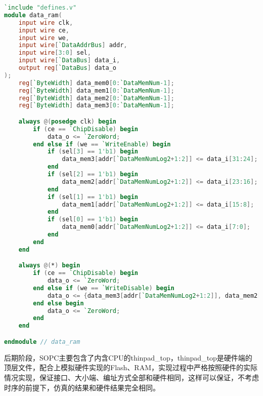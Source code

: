 \begin{lstlisting}[language=verilog]
`include "defines.v"
module data_ram(
    input wire clk,
    input wire ce,
    input wire we,
    input wire[`DataAddrBus] addr,
    input wire[3:0] sel,
    input wire[`DataBus] data_i,
    output reg[`DataBus] data_o
);
    reg[`ByteWidth] data_mem0[0:`DataMemNum-1];
    reg[`ByteWidth] data_mem1[0:`DataMemNum-1];
    reg[`ByteWidth] data_mem2[0:`DataMemNum-1];
    reg[`ByteWidth] data_mem3[0:`DataMemNum-1];

    always @(posedge clk) begin
        if (ce == `ChipDisable) begin
            data_o <= `ZeroWord;
        end else if (we == `WriteEnable) begin
            if (sel[3] == 1'b1) begin
                data_mem3[addr[`DataMemNumLog2+1:2]] <= data_i[31:24]; 
            end
            if (sel[2] == 1'b1) begin
                data_mem2[addr[`DataMemNumLog2+1:2]] <= data_i[23:16]; 
            end
            if (sel[1] == 1'b1) begin
                data_mem1[addr[`DataMemNumLog2+1:2]] <= data_i[15:8]; 
            end
            if (sel[0] == 1'b1) begin
                data_mem0[addr[`DataMemNumLog2+1:2]] <= data_i[7:0]; 
            end
        end
    end

    always @(*) begin
        if (ce == `ChipDisable) begin
            data_o <= `ZeroWord;
        end else if (we == `WriteDisable) begin
            data_o <= {data_mem3[addr[`DataMemNumLog2+1:2]], data_mem2[addr[`DataMemNumLog2+1:2]], data_mem1[addr[`DataMemNumLog2+1:2]], data_mem0[addr[`DataMemNumLog2+1:2]]};
        end else begin
            data_o <= `ZeroWord; 
        end
    end

endmodule // data_ram
\end{lstlisting}

后期阶段，SOPC主要包含了内含CPU的thinpad\_top，thinpad\_top是硬件端的顶层文件，配合上模拟硬件实现的Flash、RAM，实现过程中严格按照硬件的实际情况实现，保证接口、大小端、编址方式全部和硬件相同，这样可以保证，不考虑时序的前提下，仿真的结果和硬件结果完全相同。

